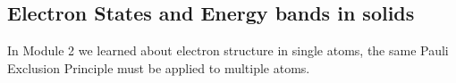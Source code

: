 \documentclass{article}
\begin{document}
\subsection{Electron States and Energy bands in solids}
In Module 2 we learned about electron structure in single atoms, the same Pauli Exclusion Principle must be applied to multiple atoms.



\begin{equation}
    \begin{split}
    \end{split}
\end{equation}
\end{document}
